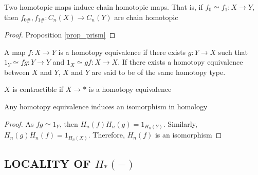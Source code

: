 \documentclass{report}
\begin{document}
\begin{proposition}
    \label{prop_5}
    Two homotopic maps induce chain homotopic maps. That is, if $f_0 \simeq f_1: X \to Y$, then $f_{0\#}, f_{1\#}: C_n(X) \to C_n(Y)$ are chain homotopic
    \begin{center}
    \end{center}
    
\end{proposition}
\begin{proof}
    Proposition \ref{prop_prism}
\end{proof}

\begin{definition}
    A map $f: X \to Y$ is a homotopy equivalence if there exists $g: Y \to X$ such that
    $1_Y \simeq fg: Y \to Y$ and $1_X \simeq gf: X \to X$. If there exists a homotopy equivalence between $X$ and $Y$, $X$ and $Y$ are said to be of the same homotopy type.
\end{definition}

\begin{definition}[contractible]
    $X$ is contractible if $X \to *$ is a homotopy equivalence
\end{definition}

\begin{corollary}
    Any homotopy equivalence induces an isomorphism in homology
\end{corollary}

\begin{proof}
    As $fg \simeq 1_Y$, then $H_n(f) H_n(g) = 1_{H_n(Y)}$. Similarly, $H_n(g) H_n(f) = 1_{H_n(X)}$. Therefore, $H_n(f)$ is an isomorphism
\end{proof}



\subsection{LOCALITY OF $H_*(-)$}
\end{document}
